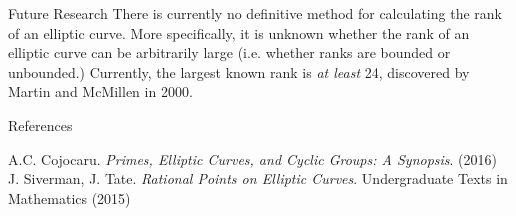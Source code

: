 \documentclass{beamer}
\begin{document}
\begin{frame}{}
\begin{columns}[t]
\begin{column}{0.245\linewidth}
\begin{block}{Future Research}
There is currently no definitive method for calculating the rank of an elliptic curve. More specifically, it is unknown whether the rank of an elliptic curve can be arbitrarily large (i.e. whether ranks are bounded or unbounded.) Currently, the largest known rank is \textit{at least} 24, discovered by Martin and McMillen in 2000. 
\end{block}

\begin{block}{References}
\begin{thebibliography}{99}
 A.C. Cojocaru. \emph{Primes, Elliptic Curves, and Cyclic Groups: A Synopsis}. (2016)
    J. Siverman, J. Tate. \emph{Rational Points on Elliptic Curves}. Undergraduate Texts in Mathematics (2015)
\end{thebibliography}
\end{block}
\end{column}%

\end{columns}
\end{frame}
\end{document}
